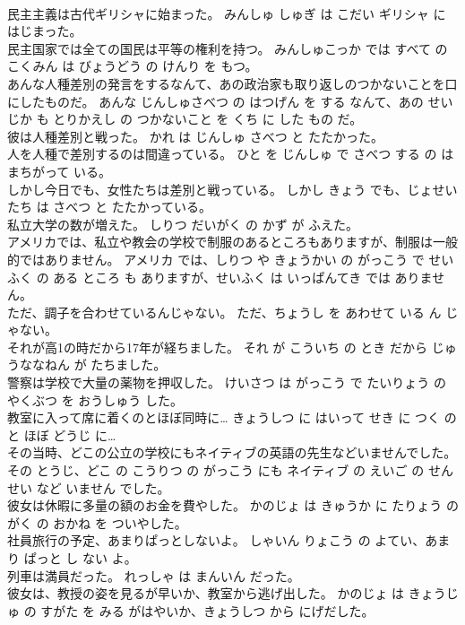 \documentclass[8pt]{extreport}
\begin{document}
\begin{CJK}{UTF8}{min}
\\	民主主義は古代ギリシャに始まった。	みんしゅ しゅぎ は こだい ギリシャ に はじまった。	
\\	民主国家では全ての国民は平等の権利を持つ。	みんしゅこっか では すべて の こくみん は びょうどう の けんり を もつ。	
\\	あんな人種差別の発言をするなんて、あの政治家も取り返しのつかないことを口にしたものだ。	あんな じんしゅさべつ の はつげん を する なんて、あの せいじか も とりかえし の つかないこと を くち に した もの だ。	
\\	彼は人種差別と戦った。	かれ は じんしゅ さべつ と たたかった。	
\\	人を人種で差別するのは間違っている。	ひと を じんしゅ で さべつ する の は まちがって いる。	
\\	しかし今日でも、女性たちは差別と戦っている。	しかし きょう でも、じょせいたち は さべつ と たたかっている。	
\\	私立大学の数が増えた。	しりつ だいがく の かず が ふえた。	
\\	アメリカでは、私立や教会の学校で制服のあるところもありますが、制服は一般的ではありません。	アメリカ では、しりつ や きょうかい の がっこう で せいふく の ある ところ も ありますが、せいふく は いっぱんてき では ありません。	
\\	ただ、調子を合わせているんじゃない。	ただ、ちょうし を あわせて いる ん じゃない。	
\\	それが高1の時だから17年が経ちました。	それ が こういち の とき だから じゅうななねん が たちました。	
\\	警察は学校で大量の薬物を押収した。	けいさつ は がっこう で たいりょう の やくぶつ を おうしゅう した。	
\\	教室に入って席に着くのとほぼ同時に…	きょうしつ に はいって せき に つく のと ほぼ どうじ に…	
\\	その当時、どこの公立の学校にもネイティブの英語の先生などいませんでした。	その とうじ、どこ の こうりつ の がっこう にも ネイティブ の えいご の せんせい など いません でした。	
\\	彼女は休暇に多量の額のお金を費やした。	かのじょ は きゅうか に たりょう の がく の おかね を ついやした。	
\\	社員旅行の予定、あまりぱっとしないよ。	しゃいん りょこう の よてい、あまり ぱっと し ない よ。	
\\	列車は満員だった。	れっしゃ は まんいん だった。	
\\	彼女は、教授の姿を見るが早いか、教室から逃げ出した。	かのじょ は きょうじゅ の すがた を みる がはやいか、きょうしつ から にげだした。	

\end{CJK}
\end{document}
